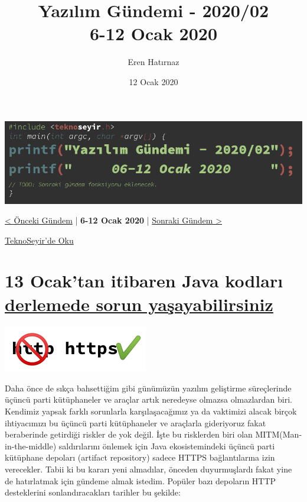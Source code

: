 \documentclass[11pt]{article}
\author{Eren Hatırnaz}
\date{12 Ocak 2020}
\title{Yazılım Gündemi - 2020/02\\\medskip
\large 6-12 Ocak 2020}
\begin{document}
\maketitle
\tableofcontents \clearpage\shorthandoff{=}

\begin{center}
\includegraphics[width=.9\linewidth]{gorseller/yazilim-gundemi-banner.png}
\end{center}

\begin{center}
\href{../01/yazilim-gundemi-2020-01.pdf}{< Önceki Gündem} | \textbf{6-12 Ocak 2020} | \href{../03/yazilim-gundemi-2020-03.pdf}{Sonraki Gündem >}

\href{https://teknoseyir.com/blog/yazilim-gundemi-2020-02}{TeknoSeyir'de Oku}
\end{center}

\section{13 Ocak'tan itibaren Java kodları \href{https://www.alphabot.com/security/blog/2020/java/Your-Java-builds-might-break-starting-January-13th.html?utm\_name=iossmf}{derlemede sorun yaşayabilirsiniz}}
\label{sec:org18e2733}
\begin{center}
\includegraphics[height=2cm]{gorseller/java-https.png}
\end{center}

Daha önce de sıkça bahsettiğim gibi günümüzün yazılım geliştirme süreçlerinde
üçüncü parti kütüphaneler ve araçlar artık neredeyse olmazsa olmazlardan biri.
Kendimiz yapsak farklı sorunlarla karşılaşacağımız ya da vaktimizi alacak
birçok ihtiyacımızı bu üçüncü parti kütüphaneler ve araçlarla gideriyoruz fakat
beraberinde getirdiği riskler de yok değil. İşte bu risklerden biri olan
MITM(Man-in-the-middle) saldırılarını önlemek için Java ekosistemindeki üçüncü
parti kütüphane depoları (artifact repository) sadece HTTPS bağlantılarına izin
verecekler. Tabii ki bu kararı yeni almadılar, önceden duyurmuşlardı fakat yine
de hatırlatmak için gündeme almak istedim. Popüler bazı depoların HTTP
desteklerini sonlandıracakları tarihler bu şekilde:
\end{document}
